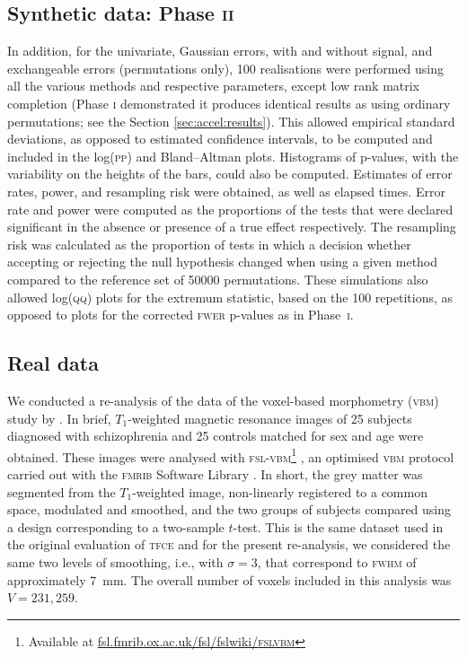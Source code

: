 \subsection{Synthetic data: Phase \textsc{ii}}

In addition, for the univariate, Gaussian errors, with and without signal, and exchangeable errors (permutations only), 100 realisations were performed using all the various methods and respective parameters, except low rank matrix completion (Phase \textsc{i} demonstrated it produces identical results as using ordinary permutations; see the Section \ref{sec:accel:results}). This allowed empirical standard deviations, as opposed to estimated confidence intervals, to be computed and included in the log(\textsc{pp}) and Bland--Altman plots. Histograms of p-values, with the variability on the heights of the bars, could also be computed. Estimates of error rates, power, and resampling risk were obtained, as well as elapsed times. Error rate and power were computed as the proportions of the tests that were declared significant in the absence or presence of a true effect respectively. The resampling risk was calculated as the proportion of tests in which a decision whether accepting or rejecting the null hypothesis changed when using a given method compared to the reference set of 50000 permutations. These simulations also allowed log(\textsc{qq}) plots for the extremum statistic, based on the 100 repetitions, as opposed to plots for the corrected \textsc{fwer} p-values as in Phase~\textsc{i}.

\subsection{Real data}

We conducted a re-analysis of the data of the voxel-based morphometry (\textsc{vbm}) study by \citet{Douaud2007}. In brief, $T_1$-weighted magnetic resonance images of 25 subjects diagnosed with schizophrenia and 25 controls matched for sex and age were obtained. These images were analysed with \textsc{fsl-vbm}\footnote{Available at \href{http://fsl.fmrib.ox.ac.uk/fsl/fslwiki/FSLVBM}{fsl.fmrib.ox.ac.uk/fsl/fslwiki/\textsc{fslvbm}}} \citep{Douaud2007}, an optimised \textsc{vbm} protocol \citep{Good2001} carried out with the \textsc{fmrib} Software Library \citep[\textsc{fsl;}][]{Smith2004}. In short, the grey matter was segmented from the $T_1$-weighted image, non-linearly registered to a common space, modulated and smoothed, and the two groups of subjects compared using a design corresponding to a two-sample $t$-test. This is the same dataset used in the original evaluation of \textsc{tfce} \citep{Smith2009} and for the present re-analysis, we considered the same two levels of smoothing, i.e., with $\sigma=3$, that correspond to \textsc{fwhm} of approximately 7~mm. The overall number of voxels included in this analysis was $V = 231,259$.

